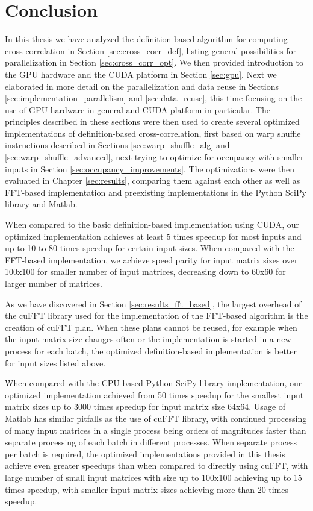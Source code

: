 \chapter*{Conclusion}

In this thesis we have analyzed the definition-based algorithm for computing cross-correlation in Section \ref{sec:cross_corr_def}, listing general possibilities for parallelization in Section \ref{sec:cross_corr_opt}. %
We then provided introduction to the GPU hardware and the CUDA platform in Section \ref{sec:gpu}. Next we elaborated in more detail on the parallelization and data reuse in Sections \ref{sec:implementation_parallelism} and \ref{sec:data_reuse}, this time focusing on the use of GPU hardware in general and CUDA platform in particular. The principles described in these sections were then used to create several optimized implementations of definition-based cross-correlation, first based on warp shuffle instructions described in Sections \ref{sec:warp_shuffle_alg} and \ref{sec:warp_shuffle_advanced}, next trying to optimize for occupancy with smaller inputs in Section \ref{sec:occupancy_improvements}. The optimizations were then evaluated in Chapter \ref{sec:results}, comparing them against each other as well as FFT-based implementation and preexisting implementations in the Python SciPy library and Matlab.

When compared to the basic definition-based implementation using CUDA, our optimized implementation achieves at least 5 times speedup for most inputs and up to 10 to 80 times speedup for certain input sizes. When compared with the FFT-based implementation, we achieve speed parity for input matrix sizes over 100x100 for smaller number of input matrices, decreasing down to 60x60 for larger number of matrices. 

As we have discovered in Section \ref{sec:results_fft_based}, the largest overhead of the cuFFT library used for the implementation of the FFT-based algorithm is the creation of cuFFT plan. When these plans cannot be reused, for example when the input matrix size changes often or the implementation is started in a new process for each batch, the optimized definition-based implementation is better for input sizes listed above.

When compared with the CPU based Python SciPy library implementation, our optimized implementation achieved from 50 times speedup for the smallest input matrix sizes up to 3000 times speedup for input matrix size 64x64.  
Usage of Matlab has similar pitfalls as the use of cuFFT library, with continued processing of many input matrices in a single process being orders of magnitudes faster than separate processing of each batch in different processes. When separate process per batch is required, the optimized implementations provided in this thesis achieve even greater speedups than when compared to directly using cuFFT, with large number of small input matrices with size up to 100x100 achieving up to 15 times speedup, with smaller input matrix sizes achieving more than 20 times speedup.


